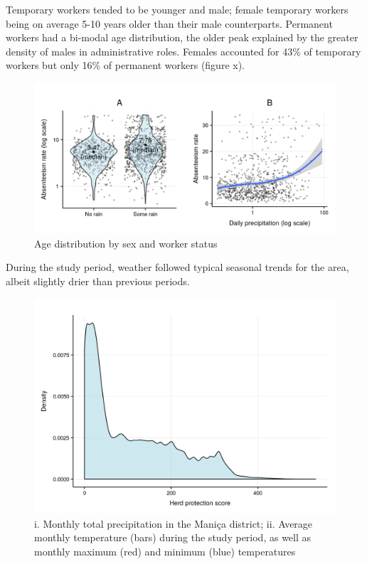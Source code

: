 \documentclass[]{article}
\begin{document}
Temporary workers tended to be younger and male; female temporary
workers being on average 5-10 years older than their male counterparts.
Permanent workers had a bi-modal age distribution, the older peak
explained by the greater density of males in administrative roles.
Females accounted for 43\% of temporary workers but only 16\% of
permanent workers (figure x).

\begin{figure}[!h]

{\centering \includegraphics{figures/unnamed-chunk-20-1} 

}

\caption{Age distribution by sex and worker status}\label{fig:unnamed-chunk-20}
\end{figure}

During the study period, weather followed typical seasonal trends for
the area, albeit slightly drier than previous periods.

\begin{figure}[!h]

{\centering \includegraphics{figures/unnamed-chunk-21-1} 

}

\caption{i. Monthly total precipitation in the Maniça district; ii. Average monthly temperature (bars) during the study period, as well as monthly maximum (red) and minimum (blue) temperatures}\label{fig:unnamed-chunk-21}
\end{figure}
\end{document}
